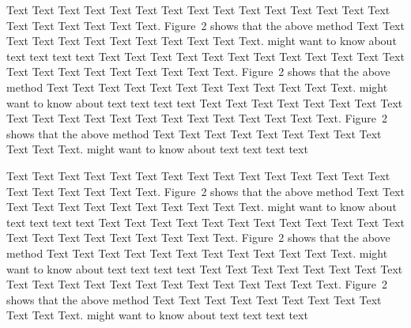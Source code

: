\documentclass{bioinfo}
\begin{document}
\begin{methods}
Text Text Text Text Text Text  Text Text Text Text Text Text Text
Text Text  Text Text Text Text Text Text.
Figure~2\vphantom{\ref{fig:02}} shows that the above method  Text
Text Text Text  Text Text Text Text Text Text  Text Text.
\citealp{Boffelli03} might want to know about  text text text text
Text Text Text Text Text Text  Text Text Text Text Text Text Text
Text Text  Text Text Text Text Text Text.
Figure~2\vphantom{\ref{fig:02}} shows that the above method  Text
Text Text Text  Text Text Text Text Text Text  Text Text.
\citealp{Boffelli03} might want to know about  text text text text
Text Text Text Text Text Text Text Text Text Text Text Text Text
Text Text  Text Text Text Text Text Text.
Figure~2\vphantom{\ref{fig:02}} shows that the above method  Text
Text Text Text  Text Text Text Text Text Text  Text Text.
\citealp{Boffelli03} might want to know about  text text text text



Text Text Text Text Text Text  Text Text Text Text Text Text Text
Text Text  Text Text Text Text Text Text.
Figure~2\vphantom{\ref{fig:02}} shows that the above method  Text
Text Text Text  Text Text Text Text Text Text  Text Text.
\citealp{Boffelli03} might want to know about  text text text text
Text Text Text Text Text Text  Text Text Text Text Text Text Text
Text Text  Text Text Text Text Text Text.
Figure~2\vphantom{\ref{fig:02}} shows that the above method  Text
Text Text Text  Text Text Text Text Text Text  Text Text.
\citealp{Boffelli03} might want to know about  text text text text
Text Text Text Text Text Text Text Text Text Text Text Text Text
Text Text  Text Text Text Text Text Text.
Figure~2\vphantom{\ref{fig:02}} shows that the above method  Text
Text Text Text  Text Text Text Text Text Text  Text Text.
\citealp{Boffelli03} might want to know about  text text\break
text text



\end{methods}
\end{document}
